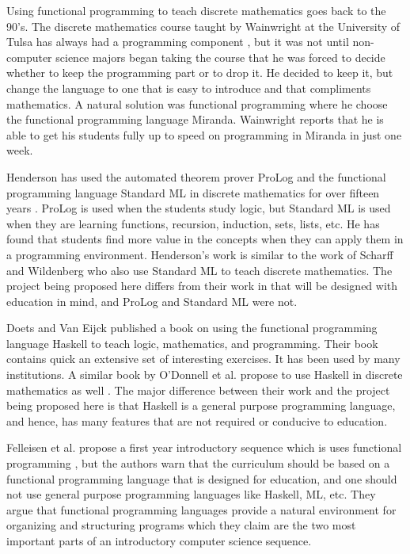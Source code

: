 Using functional programming to teach discrete mathematics goes back
to the 90's.  The discrete mathematics course taught by Wainwright at
the University of Tulsa has always had a programming component
\cite{Wainwright:1992}, but it was not until non-computer science
majors began taking the course that he was forced to decide whether to
keep the programming part or to drop it.  He decided to keep it, but
change the language to one that is easy to introduce and that
compliments mathematics.  A natural solution was functional
programming where he choose the functional programming language
Miranda.  Wainwright reports that he is able to get his students fully
up to speed on programming in Miranda in just one week.  

Henderson has used the automated theorem prover ProLog and the
functional programming language Standard ML in discrete mathematics
for over fifteen years \cite{Henderson:2002}.  ProLog is used when the
students study logic, but Standard ML is used when they are learning
functions, recursion, induction, sets, lists, etc.  He has found that
students find more value in the concepts when they can apply them in a
programming environment.  Henderson's work is similar to the work of
Scharff and Wildenberg \cite{Scharff:2002} who also use Standard ML to
teach discrete mathematics. The project being proposed here differs
from their work in that \thelang{} will be designed with education in
mind, and ProLog and Standard ML were not.

Doets and Van Eijck published a book \cite{Doets:2004} on using the
functional programming language Haskell to teach logic, mathematics,
and programming.  Their book contains quick an extensive set of
interesting exercises.  It has been used by many institutions.  A
similar book by O'Donnell et al. propose to use Haskell in discrete
mathematics as well \cite{ODonnell:2006}. The major difference between
their work and the project being proposed here is that Haskell is a
general purpose programming language, and hence, has many features
that are not required or conducive to education.

Felleisen et al. propose a first year introductory sequence which is
uses functional programming
\cite{FELLEISEN_FINDLER_FLATT_KRISHNAMURTHI_2004}, but the authors
warn that the curriculum should be based on a functional programming
language that is designed for education, and one should not use
general purpose programming languages like Haskell, ML, etc.  They
argue that functional programming languages provide a natural
environment for organizing and structuring programs which they claim
are the two most important parts of an introductory computer science
sequence.

